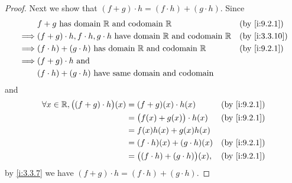 \begin{proof}
  Next we show that \((f + g) \cdot h = (f \cdot h) + (g \cdot h)\).
  Since
  \begin{align*}
             & f + g \text{ has domain } \R \text{ and codomain } \R                                   &  & \by{i:9.2.1}  \\
    \implies & (f + g) \cdot h, f \cdot h, g \cdot h  \text{ have domain } \R \text{ and codomain } \R &  & \by{i:3.3.10} \\
    \implies & (f \cdot h) + (g \cdot h)  \text{ has domain } \R \text{ and codomain } \R              &  & \by{i:9.2.1}  \\
    \implies & (f + g) \cdot h \text{ and }                                                                               \\
             & (f \cdot h) + (g \cdot h) \text{ have same domain and codomain}
  \end{align*}
  and
  \begin{align*}
    \forall x \in \R, \big((f + g) \cdot h\big)(x) & = (f + g)(x) \cdot h(x)                   &  & \by{i:9.2.1} \\
                                                   & = \big(f(x) + g(x)\big) \cdot h(x)        &  & \by{i:9.2.1} \\
                                                   & = f(x)h(x) + g(x)h(x)                                       \\
                                                   & = (f \cdot h)(x) + (g \cdot h)(x)         &  & \by{i:9.2.1} \\
                                                   & = \big((f \cdot h) + (g \cdot h)\big)(x), &  & \by{i:9.2.1}
  \end{align*}
  by \cref{i:3.3.7} we have \((f + g) \cdot h = (f \cdot h) + (g \cdot h)\).


\end{proof}

